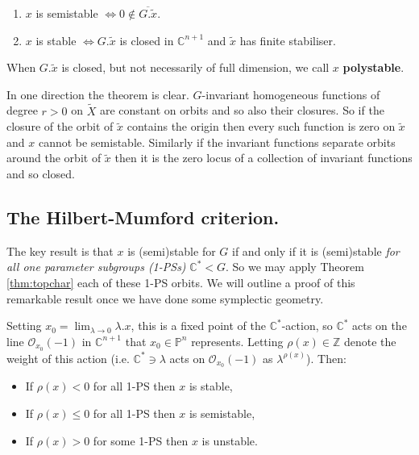 \documentclass[12pt]{article}
\begin{document}
\begin{theorem}\label{thm:topchar}
    \begin{enumerate}
        \item $x$ is semistable $\Longleftrightarrow 0 \notin \overline{G.\tilde{x}}$.
        \item $x$ is stable $\Longleftrightarrow G.\tilde{x}$ is closed in $\mathbb{C}^{n+1}$ and $\tilde{x}$ has finite stabiliser.
    \end{enumerate}
\end{theorem}

When $G.\tilde{x}$ is closed, but not necessarily of full dimension, we call $x$ \textbf{polystable}.

In one direction the theorem is clear. $G$-invariant homogeneous functions of degree $r > 0$ on $\tilde{X}$ are constant on orbits and so also their closures. So if the closure of the orbit of $\tilde{x}$ contains the origin then every such function is zero on $\tilde{x}$ and $x$ cannot be semistable. Similarly if the invariant functions separate orbits around the orbit of $\tilde{x}$ then it is the zero locus of a collection of invariant functions and so closed.

\subsection{The Hilbert-Mumford criterion.}
The key result is that $x$ is (semi)stable for $G$ if and only if it is (semi)stable \emph{for all one parameter subgroups (1-PSs)} $\mathbb{C}^* < G$. So we may apply Theorem \ref{thm:topchar} each of these 1-PS orbits. We will outline a proof of this remarkable result once we have done some symplectic geometry.

\begin{theorem}
    Setting $x_0 = \lim_{\lambda \to 0} \lambda.x$, this is a fixed point of the $\mathbb{C}^*$-action, so $\mathbb{C}^*$ acts on the line $\mathcal{O}_{x_0}(-1)$ in $\mathbb{C}^{n+1}$ that $x_0 \in \mathbb{P}^n$ represents. Letting $\rho(x) \in \mathbb{Z}$ denote the weight of this action (i.e. $\mathbb{C}^* \ni \lambda$ acts on $\mathcal{O}_{x_0}(-1)$ as $\lambda^{\rho(x)}$). Then:
\begin{itemize}
\item If $\rho(x) < 0$ for all 1-PS then $x$ is stable,
\item If $\rho(x) \leq 0$ for all 1-PS then $x$ is semistable,
\item If $\rho(x) > 0$ for some 1-PS then $x$ is unstable.
\end{itemize}
\end{theorem}
\end{document}
